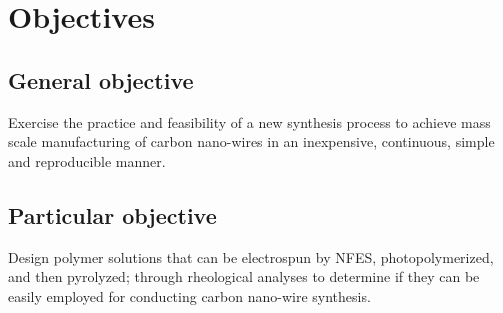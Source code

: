 
\chapter{Objectives} %

\label{Chapter:Objectives}

\section{General objective}
Exercise the practice and feasibility of a new synthesis process to achieve mass scale manufacturing of carbon nano-wires in an inexpensive, continuous, simple and reproducible manner.

\section{Particular objective}
Design polymer solutions that can be electrospun by NFES, photopolymerized, and then pyrolyzed; through rheological analyses to determine if they can be easily employed for conducting carbon nano-wire synthesis.




